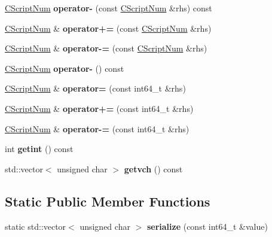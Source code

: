 \begin{DoxyCompactItemize}
\mbox{\hyperlink{class_c_script_num}{C\+Script\+Num}} {\bfseries operator-\/} (const \mbox{\hyperlink{class_c_script_num}{C\+Script\+Num}} \&rhs) const
\item 
\mbox{\label{class_c_script_num_a34a41a249893e9561b47aecb98b7fc54}} 
\mbox{\hyperlink{class_c_script_num}{C\+Script\+Num}} \& {\bfseries operator+=} (const \mbox{\hyperlink{class_c_script_num}{C\+Script\+Num}} \&rhs)
\item 
\mbox{\label{class_c_script_num_aac8cae8548fb610e67f444796d89877b}} 
\mbox{\hyperlink{class_c_script_num}{C\+Script\+Num}} \& {\bfseries operator-\/=} (const \mbox{\hyperlink{class_c_script_num}{C\+Script\+Num}} \&rhs)
\item 
\mbox{\label{class_c_script_num_af424c03c7eb0053fa5639b098d9d40ae}} 
\mbox{\hyperlink{class_c_script_num}{C\+Script\+Num}} {\bfseries operator-\/} () const
\item 
\mbox{\label{class_c_script_num_ace45ef712f5b771114c019e95b24b3be}} 
\mbox{\hyperlink{class_c_script_num}{C\+Script\+Num}} \& {\bfseries operator=} (const int64\+\_\+t \&rhs)
\item 
\mbox{\label{class_c_script_num_a75a2fce922fed2ef4433d4e9fba6f85c}} 
\mbox{\hyperlink{class_c_script_num}{C\+Script\+Num}} \& {\bfseries operator+=} (const int64\+\_\+t \&rhs)
\item 
\mbox{\label{class_c_script_num_af83fa61859f58965e26fad7b4c82cc0d}} 
\mbox{\hyperlink{class_c_script_num}{C\+Script\+Num}} \& {\bfseries operator-\/=} (const int64\+\_\+t \&rhs)
\item 
\mbox{\label{class_c_script_num_ae205465ff5e3cfef3f2f6d29d3ee250d}} 
int {\bfseries getint} () const
\item 
\mbox{\label{class_c_script_num_af1684eeaa754266aa5bd4fc5f14c6991}} 
std\+::vector$<$ unsigned char $>$ {\bfseries getvch} () const
\end{DoxyCompactItemize}
\subsection*{Static Public Member Functions}
\begin{DoxyCompactItemize}
\item 
\mbox{\label{class_c_script_num_a2e2c60f2646f03b5cec8d92a6d31b1e8}} 
static std\+::vector$<$ unsigned char $>$ {\bfseries serialize} (const int64\+\_\+t \&value)
\end{DoxyCompactItemize}
